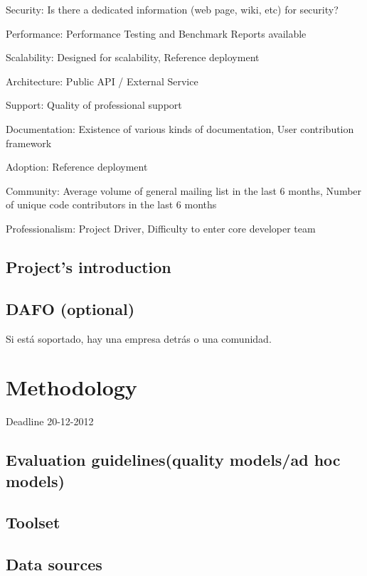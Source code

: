 \documentclass[11pt]{scrartcl}
\begin{document}
\begin{itemize}
Security: Is there a dedicated information (web page, wiki, etc) for security?

Performance: Performance Testing and Benchmark Reports available

Scalability: Designed for scalability, Reference deployment

Architecture: Public API / External Service 

Support: Quality of professional support 

Documentation: Existence of various kinds of documentation, User contribution framework 

Adoption: Reference deployment

Community: Average volume of general mailing list in the last 6 months, Number of unique code contributors in the last 6 months

Professionalism: Project Driver, Difficulty to enter core developer team

\end{itemize}


\subsection{Project's introduction}
\subsection{DAFO (optional)}

Si está soportado, hay una empresa detrás o una comunidad.

\section{Methodology}

Deadline 20-12-2012

\subsection{Evaluation guidelines(quality models/ad hoc models)}
\subsection{Toolset}
\subsection{Data sources}
\end{document}
